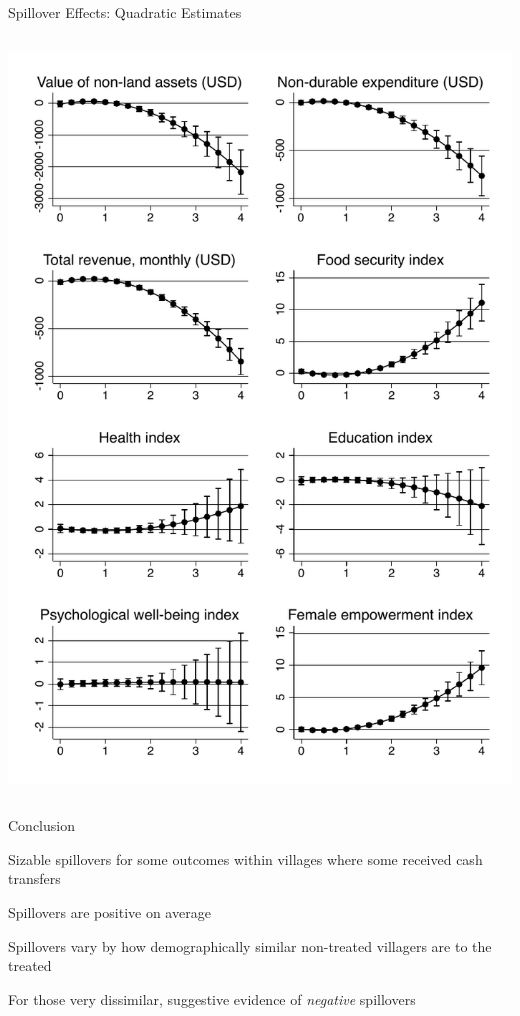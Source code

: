 \documentclass[14pt, aspectratio=169]{beamer}
\newenvironment{wideitemize}{\itemize\addtolength{\itemsep}{10pt}}{\enditemize}
\let\OLDitemize\itemize
\renewcommand\itemize{\OLDitemize\addtolength{\itemsep}{10pt}}
\begin{document}
\begin{frame}{Spillover Effects: Quadratic Estimates}
\begin{columns}[T]
\begin{column}{.45\textwidth}
{{    \includegraphics[height=\textheight, trim={0 0 0 15cm}]{../Figs/indices_ppp_margins.pdf}
    }
  }
  \end{column}%
\end{columns} 
 
\end{frame}

\begin{frame}{Conclusion}
\begin{wideitemize}
\item Sizable spillovers for some outcomes within villages where some received cash transfers
\item Spillovers are positive on average
\item Spillovers vary by how demographically similar non-treated villagers are to the treated
\item For those very dissimilar, suggestive evidence of \textit{negative} spillovers
\end{wideitemize}
\end{frame}
\end{document}
